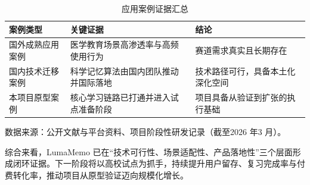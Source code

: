 \begin{table}[htbp]
	\centering
	\caption{应用案例证据汇总}
	\label{tab:chap3_case_summary}
	\begin{tabular}{p{3.2cm}p{5.2cm}p{4.8cm}}
		\toprule
		\textbf{案例类型} & \textbf{关键证据} & \textbf{结论} \\
		\midrule
		国外成熟应用案例 & 医学教育场景高渗透率与高频使用行为 & 赛道需求真实且长期存在 \\
		国内技术迁移案例 & 科学记忆算法由国内团队推动并国际落地 & 技术路径可行，具备本土化深化空间 \\
		本项目原型案例 & 核心学习链路已打通并进入试点准备阶段 & 项目具备从验证到扩张的执行基础 \\
		\bottomrule
	\end{tabular}
	\begin{flushleft}
		\footnotesize 数据来源：公开文献与平台资料、项目阶段性研发记录（截至2026 年3 月）。
	\end{flushleft}
\end{table}

综合来看，LumaMemo 已在“技术可行性、场景适配性、产品落地性”三个层面形成闭环证据。下一阶段将以高校试点为抓手，持续提升用户留存、复习完成率与付费转化率，推动项目从原型验证迈向规模化增长。
